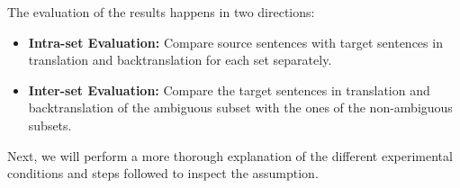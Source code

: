 The evaluation of the results happens in two directions:
\begin{itemize}
    \item \textbf{Intra-set Evaluation:} Compare source sentences with target sentences in translation and backtranslation for each set separately.
    \item \textbf{Inter-set Evaluation:} Compare the target sentences in translation and backtranslation of the ambiguous subset with the ones of the non-ambiguous subsets.
\end{itemize}

Next, we will perform a more thorough explanation of the different experimental conditions and steps followed to inspect the assumption.


